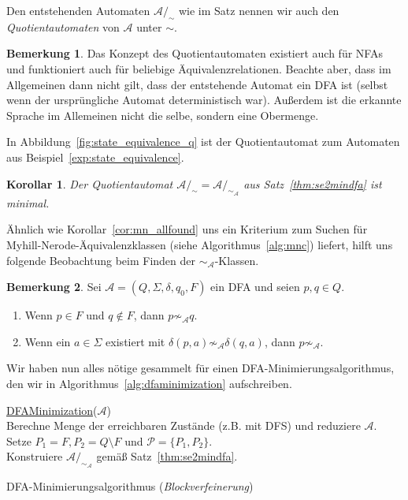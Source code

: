 \documentclass[11pt, a4paper]{article}
\theoremstyle{definition}
\newtheorem*{remark*}{Bemerkung}
\theoremstyle{plain}
\newtheorem{corollary}[definition]{Korollar}
\numberwithin{equation}{section}
\begin{document}
Den entstehenden Automaten $\mathcal{A}/_\sim$ wie im Satz nennen wir auch den \textit{Quotientautomaten} von $\mathcal{A}$ unter $\sim$. 
\begin{remark*}
	Das Konzept des Quotientautomaten existiert auch für NFAs und funktioniert auch für beliebige Äquivalenzrelationen. Beachte aber, dass im Allgemeinen dann nicht gilt, dass der entstehende Automat ein DFA ist (selbst wenn der ursprüngliche Automat deterministisch war). Außerdem ist die erkannte Sprache im Allemeinen nicht die selbe, sondern eine Obermenge.
\end{remark*}
In Abbildung~\ref{fig:state_equivalence_q} ist der Quotientautomat zum Automaten aus Beispiel~\ref{exp:state_equivalence}.
\begin{corollary}
	Der Quotientautomat $\mathcal{A}/_\sim = \mathcal{A}/_{\sim_\mathcal{A}}$ aus Satz~\ref{thm:se2mindfa} ist minimal.
\end{corollary}
Ähnlich wie Korollar~\ref{cor:mn_allfound} uns ein Kriterium zum Suchen für Myhill-Nerode-Ä\-qui\-va\-lenz\-klas\-sen (siehe Algorithmus~\ref{alg:mnc}) liefert, hilft uns folgende Beobachtung beim Finden der $\sim_\mathcal{A}$-Klassen.
\begin{remark*}
	Sei $\mathcal{A} = (Q, \Sigma, \delta, q_0, F)$ ein DFA und seien $p, q \in Q$.
	\begin{enumerate}[label=\arabic*)]
		\item Wenn $p \in F$ und $q \notin F$, dann $p \not\sim_\mathcal{A} q$.
		\item Wenn ein $a \in \Sigma$ existiert mit $\delta(p, a) \not\sim_\mathcal{A} \delta(q, a)$, dann $p \not\sim_\mathcal{A}$.
	\end{enumerate}
\end{remark*}
Wir haben nun alles nötige gesammelt für einen DFA-Minimierungsalgorithmus, den wir in Algorithmus~\ref{alg:dfaminimization} aufschreiben.
\begin{algorithm}
	\underline{DFAMinimization}{($\mathcal{A}$)}\\
	Berechne Menge der erreichbaren Zustände (z.B. mit DFS) und reduziere $\mathcal{A}$.\\
	Setze $P_1 = F, P_2 = Q \setminus F$ und $\mathcal{P} = \{P_1, P_2\}$.\\
	Konstruiere $\mathcal{A}/_{\sim_\mathcal{A}}$ gemäß Satz~\ref{thm:se2mindfa}.
	\caption{DFA-Minimierungsalgorithmus (\textit{Blockverfeinerung})}
	\label{alg:dfaminimization}
\end{algorithm}
\end{document}
